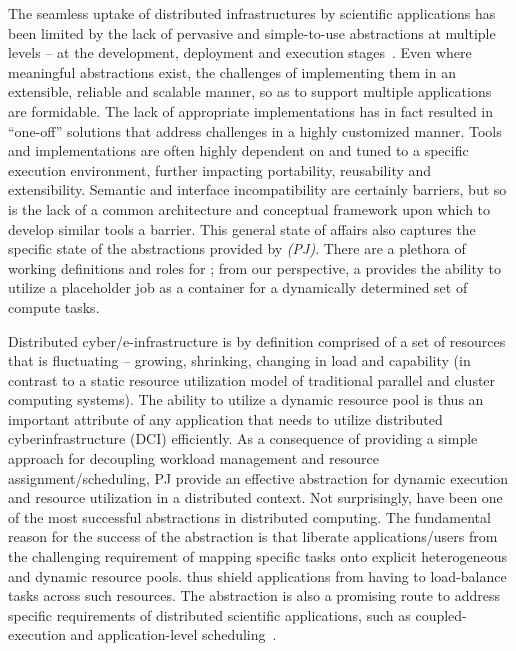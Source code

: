 \documentclass[conference]{IEEEtran}
\begin{document}
The seamless uptake of distributed infrastructures by scientific applications
has been limited by the lack of pervasive and simple-to-use abstractions at
multiple levels -- at the development, deployment and execution
stages~\cite{dpagrid2009-short}. Even where meaningful abstractions exist, the
challenges of implementing them in an extensible, reliable and scalable
manner, so as to support multiple applications are formidable. The lack of
appropriate implementations has in fact resulted in ``one-off'' solutions that
address challenges in a highly customized manner. Tools and implementations
are often highly dependent on and tuned to a specific execution environment,
further impacting portability, reusability and extensibility. Semantic and
interface incompatibility are certainly barriers, but so is the lack of a
common architecture and conceptual framework upon which to develop similar
tools a barrier. This general state of affairs also captures the specific
state of the abstractions provided by {\it \pilotjobs (PJ)}. There are a
plethora of working definitions and roles for \pilotjobs; from our
perspective, a \pilotjob provides the ability to utilize a placeholder job as
a container for a dynamically determined set of compute tasks.


Distributed cyber/e-infrastructure is by definition comprised of a set
of resources that is fluctuating -- growing, shrinking, changing in
load and capability (in contrast to a static resource utilization
model of traditional parallel and cluster computing systems).  The
ability to utilize a dynamic resource pool is thus an important
attribute of any application that needs to utilize distributed
cyberinfrastructure (DCI) efficiently. As a consequence of providing a
simple approach for decoupling workload management and resource
assignment/scheduling, PJ provide an effective abstraction for dynamic
execution and resource utilization in a distributed context.  Not
surprisingly, \pilotjobs have been one of the most successful
abstractions in distributed computing.  The fundamental reason for the
success of the \pilotjob abstraction is that \pilotjobs liberate
applications/users from the challenging requirement of mapping
specific tasks onto explicit heterogeneous and dynamic resource pools.
\pilotjobs thus shield applications from having to load-balance tasks
across such resources.  The \pilotjob abstraction is also a promising
route to address specific requirements of distributed scientific
applications, such as coupled-execution and application-level
scheduling~\cite{ko-efficient-short,DBLP:conf/hpdc/KimHMAJ10}.
\end{document}
